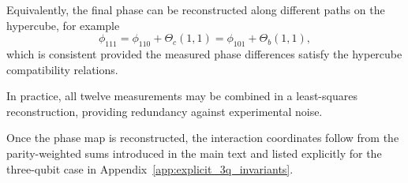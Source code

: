 \noindent
Equivalently, the final phase can be reconstructed along different paths on the hypercube, for example
\begin{equation}
\phi_{111}=\phi_{110}+\Theta_c(1,1)=\phi_{101}+\Theta_b(1,1),
\end{equation}
which is consistent provided the measured phase differences satisfy the
hypercube compatibility relations.

\medskip
\noindent
In practice, all twelve measurements may be combined in a least-squares reconstruction, providing redundancy against experimental noise.

\medskip
\noindent
Once the phase map is reconstructed, the interaction coordinates follow from the parity-weighted sums introduced in the main text and listed explicitly for the three-qubit
case in Appendix~\ref{app:explicit_3q_invariants}.


